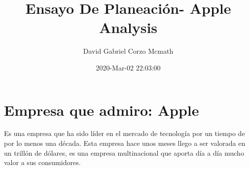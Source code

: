 \documentclass{article}
\title{Ensayo De Planeación- Apple Analysis}
\date{2020-Mar-02 22:03:00}
\author{David Gabriel Corzo Mcmath}
\begin{document}
\maketitle
\section{Empresa que admiro: Apple}
Es una empresa que ha sido líder en el mercado de tecnología por un tiempo de por lo menos una década. Esta empresa hace unos meses llego a ser valorada en un trillón de dólares, es una empresa multinacional que aporta día a día mucho valor a sus consumidores.

\end{document}
